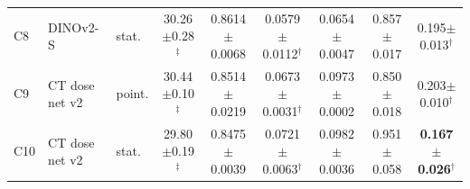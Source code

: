 \begin{table}[t]
\begin{tabular}{lllcccccc}
C8 & DINOv2-S & stat. & 30.26$\pm$0.28$^{\ddagger}$ & 0.8614$\pm$0.0068 & 0.0579$\pm$0.0112$^{\dagger}$ & 0.0654$\pm$0.0047 & 0.857$\pm$0.017 & 0.195$\pm$0.013$^{\dagger}$ \\
C9 & CT dose net v2 & point. & 30.44$\pm$0.10$^{\ddagger}$ & 0.8514$\pm$0.0219 & 0.0673$\pm$0.0031$^{\dagger}$ & 0.0973$\pm$0.0002 & 0.850$\pm$0.018 & 0.203$\pm$0.010$^{\dagger}$ \\
C10 & CT dose net v2 & stat. & 29.80$\pm$0.19$^{\ddagger}$ & 0.8475$\pm$0.0039 & 0.0721$\pm$0.0063$^{\dagger}$ & 0.0982$\pm$0.0036 & 0.951$\pm$0.058 & \textbf{0.167$\pm$0.026}$^{\dagger}$ \\
\bottomrule
\end{tabular}
\end{table}
